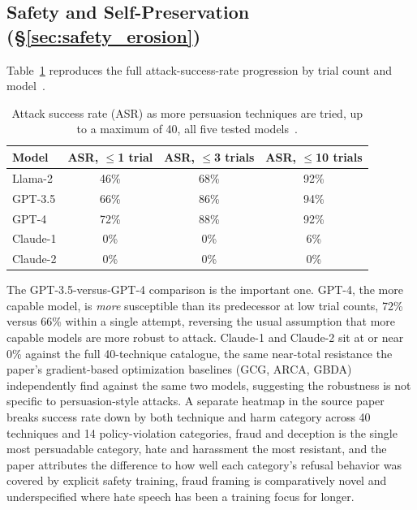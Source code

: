 \subsection{Safety and Self-Preservation (\S\ref{sec:safety_erosion})}
\label{sec:appendix_safety}

Table~\ref{tab:pap_full} reproduces the full attack-success-rate progression by trial count and model~\citep{HowJohnnyCanPersuade_Zeng}.

\begin{table}[htbp]
\centering
\footnotesize
\caption{Attack success rate (ASR) as more persuasion techniques are tried, up to a maximum of 40, all five tested models~\citep{HowJohnnyCanPersuade_Zeng}.}
\label{tab:pap_full}
\begin{tabular}{lccc}
\toprule
\textbf{Model} & \textbf{ASR, $\leq$1 trial} & \textbf{ASR, $\leq$3 trials} & \textbf{ASR, $\leq$10 trials} \\
\midrule
Llama-2 & 46\% & 68\% & 92\% \\
GPT-3.5 & 66\% & 86\% & 94\% \\
GPT-4 & 72\% & 88\% & 92\% \\
Claude-1 & 0\% & 0\% & 6\% \\
Claude-2 & 0\% & 0\% & 0\% \\
\bottomrule
\end{tabular}
\end{table}

The GPT-3.5-versus-GPT-4 comparison is the important one. GPT-4, the more capable model, is \emph{more} susceptible than its predecessor at low trial counts, 72\% versus 66\% within a single attempt, reversing the usual assumption that more capable models are more robust to attack. Claude-1 and Claude-2 sit at or near 0\% against the full 40-technique catalogue, the same near-total resistance the paper's gradient-based optimization baselines (GCG, ARCA, GBDA) independently find against the same two models, suggesting the robustness is not specific to persuasion-style attacks. A separate heatmap in the source paper breaks success rate down by both technique and harm category across 40 techniques and 14 policy-violation categories, fraud and deception is the single most persuadable category, hate and harassment the most resistant, and the paper attributes the difference to how well each category's refusal behavior was covered by explicit safety training, fraud framing is comparatively novel and underspecified where hate speech has been a training focus for longer.

